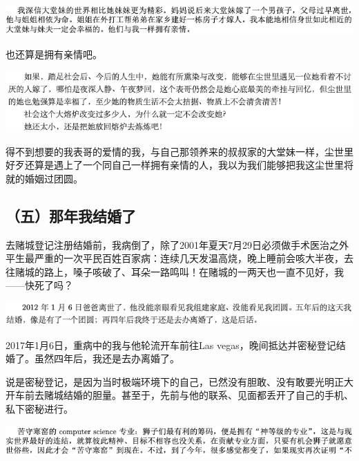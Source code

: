 \documentclass[9pt, b5paper]{article}
\begin{document}
\begin{center}
\includegraphics[width=.9\linewidth]{./pic/backups_plans_20210423_211802.png}
\end{center}

也还算是拥有亲情吧。

\begin{center}
\includegraphics[width=.9\linewidth]{./pic/backups_plans_20210423_213157.png}
\end{center}

得不到想要的我表哥的爱情的我，与自己那领养来的叔叔家的大堂妹一样，尘世里好歹还算是遇上了一个同自己一样拥有亲情的人，我以为我们能够把我这尘世里将就的婚姻过团圆。

\subsection{（五）那年我结婚了}
\label{sec:orgb636928}

去赌城登记注册结婚前，我病倒了，除了2001年夏天7月29日必须做手术医治之外平生最严重的一次平民百姓百家病：连续几天发温高烧，晚上睡前会咳大半夜，去往赌城的路上，嗓子咳破了、耳朵一路鸣叫！在赌城的一两天也一直不见好，我——快死了吗？

\begin{center}
\includegraphics[width=.9\linewidth]{./pic/backups_plans_20210423_213744.png}
\end{center}

2017年1月6日，重病中的我与他轮流开车前往Las vegas，晚间抵达并密秘登记结婚了。虽然四年后，我还是去办离婚了。

说是密秘登记，是因为当时极端环境下的自己，已然没有胆敢、没有敢要光明正大开车前去赌城结婚的胆量。甚至于，先前与他的联系、见面都丢开了自己的手机、私下密秘进行。

\begin{center}
\includegraphics[width=.9\linewidth]{./pic/backups_plans_20210427_120126.png}
\end{center}
\end{document}
